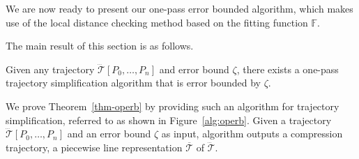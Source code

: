 {We are now ready to present our one-pass error bounded algorithm, which makes use of the local distance checking method based on the fitting function $\mathbb{F}$.

The main result of this section is as follows.


\begin{ttheorem}
\label{thm-operb}
Given any trajectory $\dddot{\mathcal{T}}[P_0, \ldots, P_{n}]$ and error bound $\zeta$, there exists a one-pass trajectory simplification algorithm that is error bounded by $\zeta$.
\end{ttheorem}

We prove Theorem~\ref{thm-operb} by providing such an algorithm for  trajectory simplification, referred to as \operb shown in Figure~\ref{alg:operb}. Given
a trajectory $\dddot{\mathcal{T}}[P_0, \ldots, P_n]$ and an error bound $\zeta$ as input, algorithm \operb outputs a compression trajectory, \ie a piecewise line representation $\overline{\mathcal{T}}$ of $\dddot{\mathcal{T}}$.

}
